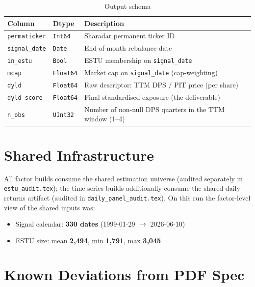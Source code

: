 \documentclass[11pt,a4paper]{article}
\begin{document}
\begin{table}[h!]
\centering
\caption{Output schema}
\begin{tabular}{llp{7.4cm}}
\toprule
\textbf{Column} & \textbf{Dtype} & \textbf{Description} \\
\midrule
\texttt{permaticker} & \texttt{Int64} & Sharadar permanent ticker ID \\
\texttt{signal\_date} & \texttt{Date} & End-of-month rebalance date \\
\texttt{in\_estu} & \texttt{Bool} & ESTU membership on \texttt{signal\_date} \\
\texttt{mcap} & \texttt{Float64} & Market cap on \texttt{signal\_date} (cap-weighting) \\
\texttt{dyld} & \texttt{Float64} & Raw descriptor: TTM DPS / PIT price (per share) \\
\texttt{dyld\_score} & \texttt{Float64} & Final standardised exposure (the deliverable) \\
\texttt{n\_obs} & \texttt{UInt32} & Number of non-null DPS quarters in the TTM window (1--4) \\
\bottomrule
\end{tabular}
\end{table}

\section{Shared Infrastructure}

All factor builds consume the shared estimation universe
 (audited separately in
\texttt{estu\_audit.tex}); the time-series builds additionally consume the
shared daily-returns artifact (audited in \texttt{daily\_panel\_audit.tex}).
On this run the factor-level view of the shared inputs was:

\begin{itemize}[leftmargin=*,topsep=2pt,itemsep=2pt]
  \item Signal calendar: \textbf{330 dates} (1999-01-29 $\to$ 2026-06-10)
  \item ESTU size: mean \textbf{2{,}494}, min \textbf{1{,}791}, max \textbf{3{,}045}
\end{itemize}

\section{Known Deviations from PDF Spec}
\end{document}
